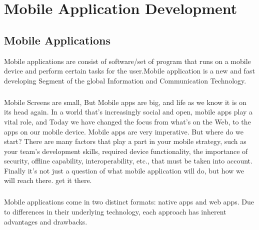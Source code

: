 \chapter{Mobile Application Development} %

\label{Chapter3} %







\section{ Mobile Applications}


Mobile applications are consist of software/set of program that runs on a mobile device and perform certain tasks for the user.Mobile application is a new and fast developing Segment of the global Information and Communication Technology.
\paragraph{}
Mobile Screens are small, But Mobile apps are big, and life as we know it is on its head again.
In a world that's increasingly social and open, mobile apps play a vital role, and Today we have changed the focus from what's on the Web, to the apps on our mobile device. Mobile apps are very imperative. But where do we  start?  There are many factors that play a part in your mobile strategy, such as your team’s development skills, required device functionality, the importance of security, offline capability, interoperability, etc., that must be taken into account. Finally it’s not just a question of what mobile application  will do, but how we will reach there. get it there.

\paragraph{}
Mobile applications come in two distinct formats: native apps and web apps. Due to differences in their underlying technology, each approach has inherent advantages and drawbacks.


